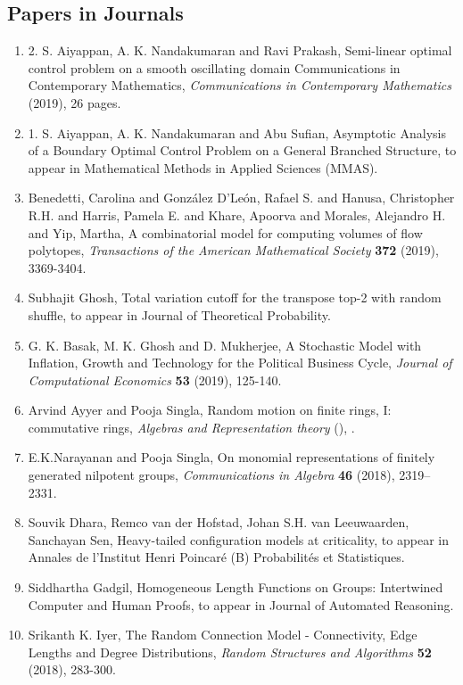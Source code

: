 
\subsection{Papers in Journals}

\begin{enumerate}
\item 2. S. Aiyappan, A. K. Nandakumaran and Ravi Prakash, Semi-linear optimal control problem on a smooth oscillating domain Communications in Contemporary Mathematics, {\em Communications in Contemporary Mathematics} {\bf } (2019), 26 pages.
\item 1. S. Aiyappan, A. K. Nandakumaran and Abu Sufian, Asymptotic Analysis of a Boundary Optimal Control Problem on a General Branched Structure, to appear in Mathematical Methods in Applied Sciences (MMAS).
\item Benedetti, Carolina and González D’León, Rafael S. and Hanusa, Christopher R.H. and Harris, Pamela E. and Khare, Apoorva and Morales, Alejandro H. and Yip, Martha, A combinatorial model for computing volumes of flow polytopes, {\em Transactions of the American Mathematical Society} {\bf 372} (2019), 3369-3404.
\item Subhajit Ghosh, Total variation cutoff for the transpose top-2 with random shuffle, to appear in Journal of Theoretical Probability.
\item G. K. Basak, M. K. Ghosh and D. Mukherjee, A Stochastic Model with Inflation, Growth and Technology for the Political Business Cycle, {\em Journal of Computational Economics} {\bf 53} (2019), 125-140.
\item Arvind Ayyer and Pooja Singla, Random motion on finite rings, I: commutative rings, {\em Algebras and Representation theory} {\bf } (), .
\item E.K.Narayanan and Pooja Singla, On monomial representations of finitely generated nilpotent groups, {\em Communications in Algebra} {\bf 46} (2018), 2319–2331.
\item Souvik Dhara, Remco van der Hofstad, Johan S.H. van Leeuwaarden, Sanchayan Sen, Heavy-tailed configuration models at criticality, to appear in Annales de l'Institut Henri Poincaré (B) Probabilités et Statistiques.
\item Siddhartha Gadgil, Homogeneous Length Functions on Groups: Intertwined Computer and Human Proofs, to appear in Journal of Automated Reasoning.
\item Srikanth K. Iyer, The Random Connection Model - Connectivity, Edge Lengths and Degree Distributions, {\em Random Structures and Algorithms} {\bf 52} (2018), 283-300.

\end{enumerate}

